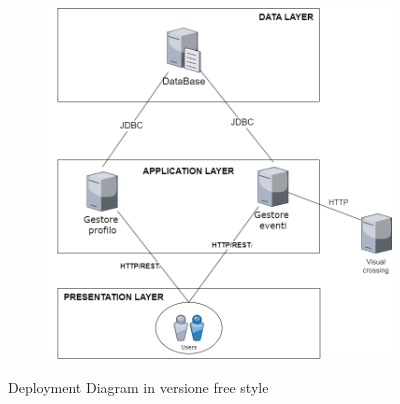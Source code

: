 \begin{figure}[ht!]
    \centering
    \begin{subfigure}{0.9\textwidth}
        \includegraphics[width=\linewidth]{immagini/DeployemenFreeStyle.png}
    \end{subfigure}
    \caption{Deployment Diagram in versione free style}
    \label{fig: DeployementFreeStyle}
\end{figure}
